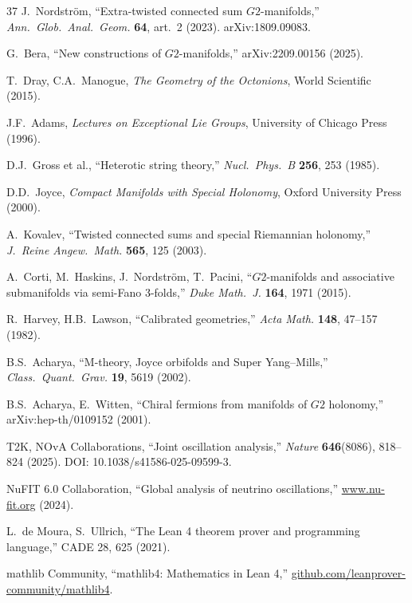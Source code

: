 \documentclass[11pt,a4paper]{article}
\newcommand{\Gtwo}{\mathrm{G}_2}
\def\Gtwo{G2}%
\begin{document}
\begin{thebibliography}{37}
 J.~Nordstr\"om, ``Extra-twisted connected sum $\Gtwo$-manifolds,'' \textit{Ann.\ Glob.\ Anal.\ Geom.} \textbf{64}, art.\ 2 (2023). arXiv:1809.09083.

 G.~Bera, ``New constructions of $\Gtwo$-manifolds,'' arXiv:2209.00156 (2025).

 T.~Dray, C.A.~Manogue, \textit{The Geometry of the Octonions}, World Scientific (2015).

 J.F.~Adams, \textit{Lectures on Exceptional Lie Groups}, University of Chicago Press (1996).

 D.J.~Gross et al., ``Heterotic string theory,'' \textit{Nucl.\ Phys.\ B} \textbf{256}, 253 (1985).

 D.D.~Joyce, \textit{Compact Manifolds with Special Holonomy}, Oxford University Press (2000).

 A.~Kovalev, ``Twisted connected sums and special Riemannian holonomy,'' \textit{J.\ Reine Angew.\ Math.} \textbf{565}, 125 (2003).

 A.~Corti, M.~Haskins, J.~Nordstr\"om, T.~Pacini, ``$\Gtwo$-manifolds and associative submanifolds via semi-Fano 3-folds,'' \textit{Duke Math.\ J.} \textbf{164}, 1971 (2015).

 R.~Harvey, H.B.~Lawson, ``Calibrated geometries,'' \textit{Acta Math.} \textbf{148}, 47--157 (1982).

 B.S.~Acharya, ``M-theory, Joyce orbifolds and Super Yang--Mills,'' \textit{Class.\ Quant.\ Grav.} \textbf{19}, 5619 (2002).

 B.S.~Acharya, E.~Witten, ``Chiral fermions from manifolds of $\Gtwo$ holonomy,'' arXiv:hep-th/0109152 (2001).

 T2K, NOvA Collaborations, ``Joint oscillation analysis,'' \textit{Nature} \textbf{646}(8086), 818--824 (2025). DOI: 10.1038/s41586-025-09599-3.

 NuFIT 6.0 Collaboration, ``Global analysis of neutrino oscillations,'' \url{www.nu-fit.org} (2024).

 L.~de Moura, S.~Ullrich, ``The Lean 4 theorem prover and programming language,'' CADE 28, 625 (2021).

 mathlib Community, ``mathlib4: Mathematics in Lean 4,'' \url{github.com/leanprover-community/mathlib4}.


\end{thebibliography}
\end{document}
